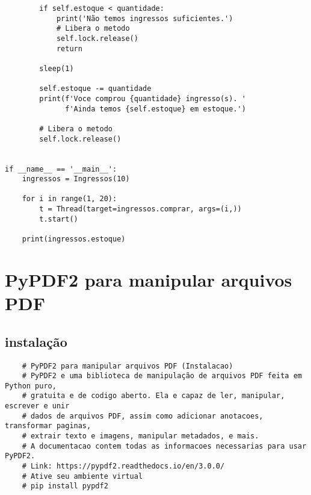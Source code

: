 \documentclass{article}
\begin{document}
\begin{lstlisting}
        if self.estoque < quantidade:
            print('Não temos ingressos suficientes.')
            # Libera o metodo
            self.lock.release()
            return

        sleep(1)

        self.estoque -= quantidade
        print(f'Voce comprou {quantidade} ingresso(s). '
              f'Ainda temos {self.estoque} em estoque.')

        # Libera o metodo
        self.lock.release()


if __name__ == '__main__':
    ingressos = Ingressos(10)

    for i in range(1, 20):
        t = Thread(target=ingressos.comprar, args=(i,))
        t.start()

    print(ingressos.estoque)
\end{lstlisting}

\section{PyPDF2 para manipular arquivos PDF }
\subsection{instalação}
\begin{lstlisting}
    # PyPDF2 para manipular arquivos PDF (Instalacao)
    # PyPDF2 e uma biblioteca de manipulação de arquivos PDF feita em Python puro,
    # gratuita e de codigo aberto. Ela e capaz de ler, manipular, escrever e unir
    # dados de arquivos PDF, assim como adicionar anotacoes, transformar paginas,
    # extrair texto e imagens, manipular metadados, e mais.
    # A documentacao contem todas as informacoes necessarias para usar PyPDF2.
    # Link: https://pypdf2.readthedocs.io/en/3.0.0/
    # Ative seu ambiente virtual
    # pip install pypdf2

\end{lstlisting}
\end{document}
